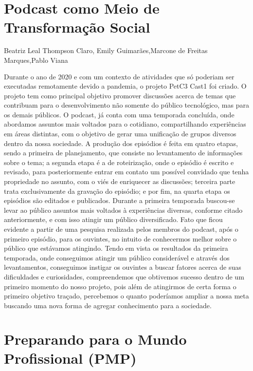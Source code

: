 

\section{Podcast como Meio de Transformação Social}

Beatriz Leal Thompson Claro, Emily Guimarães,Marcone de Freitas Marques,Pablo Viana

Durante o ano de 2020 e com um contexto de atividades que só poderiam ser executadas
remotamente devido a pandemia, o projeto PetC3 Cast1
foi criado. O projeto tem como principal
objetivo promover discussões acerca de temas que contribuam para o desenvolvimento não
somente do público tecnológico, mas para os demais públicos. O podcast, já conta com uma
temporada concluída, onde abordamos assuntos mais voltados para o cotidiano, compartilhando
experiências em áreas distintas, com o objetivo de gerar uma unificação de grupos diversos
dentro da nossa sociedade.
A produção dos episódios é feita em quatro etapas, sendo a primeira de planejamento,
que consiste no levantamento de informações sobre o tema; a segunda etapa é a de roteirização,
onde o episódio é escrito e revisado, para posteriormente entrar em contato um possível
convidado que tenha propriedade no assunto, com o viés de enriquecer as discussões; terceira
parte trata exclusivamente da gravação do episódio; e por fim, na quarta etapa os episódios são
editados e publicados.
Durante a primeira temporada buscou-se levar ao público assuntos mais voltados à
experiências diversas, conforme citado anteriormente, e com isso atingir um público
diversificado. Fato que ficou evidente a partir de uma pesquisa realizada pelos membros do
podcast, após o primeiro episódio, para os ouvintes, no intuito de conhecermos melhor sobre o
público que estávamos atingindo.
Tendo em vista os resultados da primeira temporada, onde conseguimos atingir um
público considerável e através dos levantamentos, conseguimos instigar os ouvintes a buscar
fatores acerca de suas dificuldades e curiosidades, compreendemos que obtivemos sucesso
dentro de um primeiro momento do nosso projeto, pois além de atingirmos de certa forma o
primeiro objetivo traçado, percebemos o quanto poderíamos ampliar a nossa meta buscando uma
nova forma de agregar conhecimento para a sociedade.



\section{Preparando para o Mundo Profissional (PMP)}

